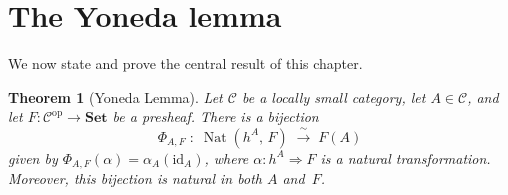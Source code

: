 \documentclass[a4paper,12pt]{book}
\DeclareMathOperator{\Nat}{Nat}
\newcommand{\Set}{\mathbf{Set}}
\newcommand{\op}{\mathrm{op}}
\newcommand{\id}{\mathrm{id}}
\theoremstyle{definition}
\theoremstyle{plain}
\newtheorem{theorem}[definition]{Theorem}
\theoremstyle{remark}
\begin{document}
\section{The Yoneda lemma}\label{sec:yoneda-lemma}

We now state and prove the central result of this chapter.

\begin{theorem}[Yoneda Lemma]\label{thm:yoneda}
Let $\mathcal{C}$ be a locally small category, let $A\in\mathcal{C}$,
and let $F\colon\mathcal{C}^{\op}\to\Set$ be a presheaf.
There is a bijection
\[
    \Phi_{A,F} \;\colon\;
    \Nat(h^A,\,F) \;\xrightarrow{\;\sim\;}\; F(A)
\]
given by $\Phi_{A,F}(\alpha) = \alpha_A(\id_A)$, where
$\alpha\colon h^A\Rightarrow F$ is a natural transformation.
Moreover, this bijection is natural in both $A$ and~$F$.
\end{theorem}
\end{document}
